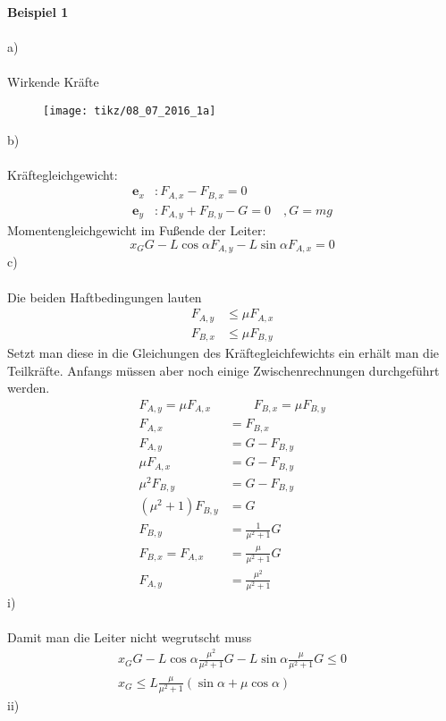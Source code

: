 \textbf{Beispiel 1}\\ \\
a)\\ \\
Wirkende Kräfte
\begin{figure}[h]
		\centering
		\texttt{[image: tikz/08\_07\_2016\_1a]}
\end{figure}
\newline
b)\\ \\
Kräftegleichgewicht:
\begin{align*}
	\textbf{e}_x &: F_{A,x} - F_{B,x} = 0 \\
	\textbf{e}_y &: F_{A,y} + F_{B,y} - G = 0 \quad,G = mg
\end{align*}
Momentengleichgewicht im Fußende der Leiter:
\[
	x_G G - L\cos\alpha F_{A,y} - L\sin\alpha F_{A,x} = 0
\]
c)\\ \\
Die beiden Haftbedingungen lauten 
\begin{align*}
	F_{A,y} &\leq \mu F_{A,x} \\
	F_{B,x} &\leq \mu F_{B,y}
\end{align*}
Setzt man diese in die Gleichungen des Kräftegleichfewichts ein erhält man die Teilkräfte. Anfangs müssen aber noch einige Zwischenrechnungen durchgeführt werden.
\begin{align*}
	F_{A,y} = \mu F_{A,x} &\qquad F_{B,x} = \mu F_{B,y} \\
	F_{A,x} &= F_{B,x} \\
	F_{A,y} &= G - F_{B,y} \\
	\mu F_{A,x} &= G - F_{B,y} \\
	\mu^2 F_{B,y} &= G - F_{B,y} \\
	(\mu^2 + 1) F_{B,y} &= G \\
	F_{B,y} &= \frac{1}{\mu^2 + 1}G \\
	F_{B,x} = F_{A,x} &= \frac{\mu}{\mu^2 + 1} G \\
	F_{A,y} &= \frac{\mu^2}{\mu^2 + 1}
\end{align*}
i)\\ \\
Damit man die Leiter nicht wegrutscht muss
\begin{align*}
	x_G G - L\cos\alpha\frac{\mu^2}{\mu^2 + 1} G - L\sin\alpha\frac{\mu}{\mu^2 + 1} G \leq 0 \\
	x_G \leq L\frac{\mu}{\mu^2 + 1} (\sin\alpha + \mu \cos\alpha)
\end{align*}
ii)\\ \\
